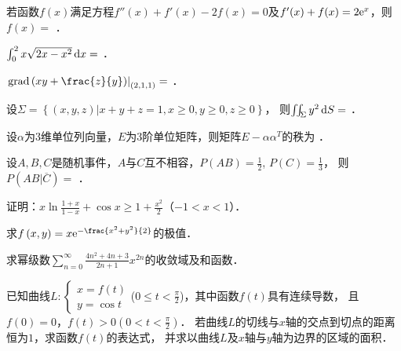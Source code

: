 \documentclass[plain,noanswer,medmath]{../../template/jnuexam}
\begin{document}


\begin{problem}
若函数$f(x)$满足方程$f''(x) + f'(x) - 2f(x) = 0$及$f'(x) + f(x) = 2\mathrm{e}^x$，则$f(x) =$ \fillin{}．
\end{problem}


\begin{problem}
$\int_0^2 x\sqrt{2x - x^2} \mathop{}\!\mathrm{d} x =$ \fillin{}．
\end{problem}


\begin{problem}
$\left.\grad\left(xy + \frac{z}{y} \right) \right|_{(2,1,1)} =$ \fillin{}．
\end{problem}


\begin{problem}
设$\Sigma = \left\{\left(x,y,z \right)\left| x + y + z = 1,x \ge 0,y \ge 0,z \ge 0 \right. \right\}$，
则$\iint_{\Sigma}y^2 \mathop{}\!\mathrm{d} S =$ \fillin{}．
\end{problem}


\begin{problem}
设$\alpha$为$3$维单位列向量，$E$为$3$阶单位矩阵，则矩阵$E - \alpha \alpha^T$的秩为 \fillin{}．
\end{problem}


\begin{problem}
设$A,B,C$是随机事件，$A$与$C$互不相容，$P(AB) = \frac{1}{2}$, $P(C) = \frac{1}{3}$，
则$P(AB|\overline{C}) =$ \fillin{}．
\end{problem}




\begin{problem}[points=10]
证明：$x\ln \frac{1 + x}{1 - x} + \cos x \ge 1 + \frac{x^2}{2}$（$- 1 < x < 1$）．
\end{problem}


\begin{problem}[points=10]
求$f\left(x,y \right) = x\e^{- \frac{x^2 + y^2}{2}}$的极值．
\end{problem}


\begin{problem}[points=10]
求幂级数$\sum_{n = 0}^{\infty}\frac{4n^2 + 4n + 3}{2n + 1}x^{2n}$的收敛域及和函数．
\end{problem}


\begin{problem}[points=10]
已知曲线$L:\begin{cases}
  x = f(t) \\
  y = \cos t
\end{cases}$($0 \le t < \frac{\pi}{2}$)，其中函数$f(t)$具有连续导数，
且$f(0) = 0$，$f(t) > 0\left(0 < t < \frac{\pi}{2} \right)$．
若曲线$L$的切线与$x$轴的交点到切点的距离恒为$1$，求函数$f(t)$的表达式，
并求以曲线$L$及$x$轴与$y$轴为边界的区域的面积．
\end{problem}
\end{document}
